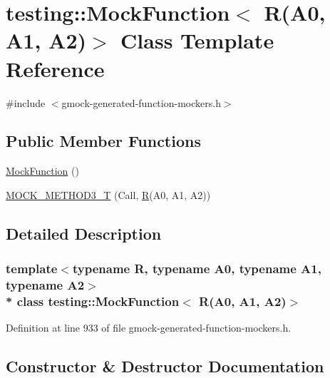 \hypertarget{classtesting_1_1_mock_function_3_01_r_07_a0_00_01_a1_00_01_a2_08_4}{}\section{testing\+:\+:Mock\+Function$<$ R(A0, A1, A2)$>$ Class Template Reference}
\label{classtesting_1_1_mock_function_3_01_r_07_a0_00_01_a1_00_01_a2_08_4}


{\ttfamily \#include $<$gmock-\/generated-\/function-\/mockers.\+h$>$}

\subsection*{Public Member Functions}
\begin{DoxyCompactItemize}
\item 
\hyperlink{classtesting_1_1_mock_function_3_01_r_07_a0_00_01_a1_00_01_a2_08_4_a33e409a6528b41103fe36844e4bb2bfe}{Mock\+Function} ()
\item 
\hyperlink{classtesting_1_1_mock_function_3_01_r_07_a0_00_01_a1_00_01_a2_08_4_afcc79eab94b7d873f71ccf7b08ce582f}{M\+O\+C\+K\+\_\+\+M\+E\+T\+H\+O\+D3\+\_\+T} (Call, \hyperlink{typedefs__9_8js_afb423b73ee7b6c04d2d54fc06e405404}{R}(A0, A1, A2))
\end{DoxyCompactItemize}


\subsection{Detailed Description}
\subsubsection*{template$<$typename R, typename A0, typename A1, typename A2$>$\\*
class testing\+::\+Mock\+Function$<$ R(\+A0, A1, A2)$>$}



Definition at line 933 of file gmock-\/generated-\/function-\/mockers.\+h.



\subsection{Constructor \& Destructor Documentation}
